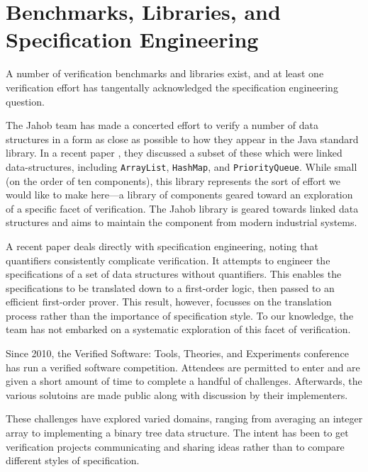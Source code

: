 \section{Benchmarks, Libraries, and Specification Engineering}\label{sec:overviewEngineering}
A number of verification benchmarks and libraries exist, and at least one verification effort has tangentally acknowledged the specification engineering question.

The Jahob team has made a concerted effort to verify a number of data structures in a form as close as possible to how they appear in the Java standard library.  In a recent paper \cite{zee:annotations}, they discussed a subset of these which were linked data-structures, including \texttt{ArrayList}, \texttt{HashMap}, and \texttt{PriorityQueue}.  While small (on the order of ten components), this library represents the sort of effort we would like to make here---a library of components geared toward an exploration of a specific facet of verification.  The Jahob library is geared towards linked data structures and aims to maintain the component from modern industrial systems.  

A recent paper\cite{bouillaguetJahobFirstOrder} deals directly with specification engineering, noting that quantifiers consistently complicate verification.  It attempts to engineer the specifications of a set of data structures without quantifiers.  This enables the specifications to be translated down to a first-order logic, then passed to an efficient first-order prover.  This result, however, focusses on the translation process rather than the importance of specification style.  To our knowledge, the team has not embarked on a systematic exploration of this facet of verification.

Since 2010, the Verified Software: Tools, Theories, and Experiments conference has run a verified software competition.  Attendees are permitted to enter and are given a short amount of time to complete a handful of challenges.  Afterwards, the various solutoins are made public along with discussion by their implementers.

These challenges have explored varied domains, ranging from averaging an integer array to implementing a binary tree data structure.  The intent has been to get verification projects communicating and sharing ideas rather than to compare different styles of specification.  

